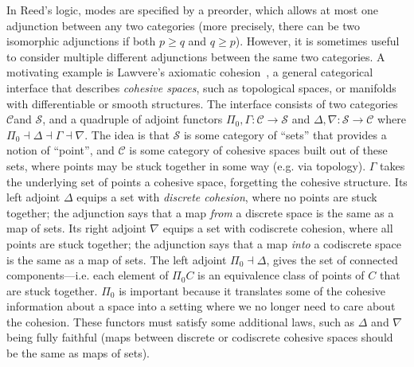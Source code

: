 \documentclass{drl-common/llncs}
\newcommand{\C}{\ensuremath{\mathcal{C}}}
\newcommand{\la}{\ensuremath{\dashv}}
\begin{document}
In Reed's logic, modes are specified by a preorder, which allows at most
one adjunction between any two categories (more precisely, there can be
two isomorphic adjunctions if both $p \ge q$ and $q \ge p$).  However,
it is sometimes useful to consider multiple different adjunctions
between the same two categories.  A motivating example is Lawvere's
axiomatic cohesion~\citep{lawvereXXcohesion}, a general categorical
interface that describes \emph{cohesive spaces}, such as topological
spaces, or manifolds with differentiable or smooth structures.  The
interface consists of two categories \C and $\mathcal{S}$, and a
quadruple of adjoint functors $\Pi_0,\Gamma : \mathcal{C} \to
\mathcal{S}$ and $\Delta,\nabla : \mathcal{S} \to \mathcal{C}$ where
$\Pi_0 \la \Delta \la \Gamma \la \nabla$.  The idea is that
$\mathcal{S}$ is some category of ``sets'' that provides a notion of
``point'', and \C\/ is some category of cohesive spaces built out of
these sets, where points may be stuck together in some way (e.g. via
topology).  $\Gamma$ takes the underlying set of points a cohesive
space, forgetting the cohesive structure.  Its left adjoint $\Delta$
equips a set with \emph{discrete cohesion}, where no points are stuck
together; the adjunction says that a map \emph{from} a discrete space is
the same as a map of sets.  Its right adjoint $\nabla$ equips a set with
codiscrete cohesion, where all points are stuck together; the adjunction
says that a map \emph{into} a codiscrete space is the same as a map of
sets.  The left adjoint $\Pi_0 \la \Delta$, gives the set of connected
components---i.e. each element of $\Pi_0 C$ is an equivalence class of
points of $C$ that are stuck together.  $\Pi_0$ is important because it
translates some of the cohesive information about a space into a setting
where we no longer need to care about the cohesion.  These functors must
satisfy some additional laws, such as $\Delta$ and $\nabla$ being fully
faithful (maps between discrete or codiscrete cohesive spaces should be
the same as maps of sets).
\end{document}

